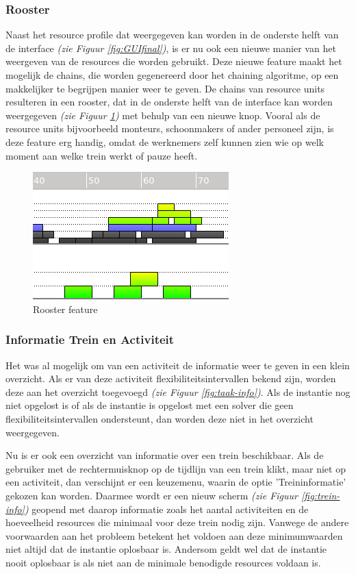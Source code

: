 \subsubsection{Rooster}
Naast het resource profile dat weergegeven kan worden in de onderste helft van de interface \emph{(zie Figuur \ref{fig:GUIfinal})}, is er nu ook een nieuwe manier van het weergeven van de resources die worden gebruikt. Deze nieuwe feature maakt het mogelijk de chains, die worden gegenereerd door het chaining algoritme, op een makkelijker te begrijpen manier weer te geven. De chains van resource units resulteren in een rooster, dat in de onderste helft van de interface kan worden weergegeven \emph{(zie Figuur \ref{fig:rooster})} met behulp van een nieuwe knop. Vooral als de resource units bijvoorbeeld monteurs, schoonmakers of ander personeel zijn, is deze feature erg handig, omdat de werknemers zelf kunnen zien wie op welk moment aan welke trein werkt of pauze heeft. 

\begin{figure}[H]
\center
\includegraphics[width=.5\textwidth]{../images/rooster.png}
\caption{Rooster feature}
\label{fig:rooster}
\end{figure}

\subsubsection{Informatie Trein en Activiteit}
Het was al mogelijk om van een activiteit de informatie weer te geven in een klein overzicht. Als er van deze activiteit flexibiliteitsintervallen bekend zijn, worden deze aan het overzicht toegevoegd \emph{(zie Figuur \ref{fig:taak-info})}. Als de instantie nog niet opgelost is of als de instantie is opgelost met een solver die geen flexibiliteitsintervallen ondersteunt, dan worden deze niet in het overzicht weergegeven.  

Nu is er ook een overzicht van informatie over een trein beschikbaar. Als de gebruiker met de rechtermuisknop op de tijdlijn van een trein klikt, maar niet op een activiteit, dan verschijnt er een keuzemenu, waarin de optie 'Treininformatie' gekozen kan worden. Daarmee wordt er een nieuw scherm \emph{(zie Figuur \ref{fig:trein-info})} geopend met daarop informatie zoals het aantal activiteiten en de hoeveelheid resources die minimaal voor deze trein nodig zijn. Vanwege de andere voorwaarden aan het probleem betekent het voldoen aan deze minimumwaarden niet altijd dat de instantie oplosbaar is. Andersom geldt wel dat de instantie nooit oplosbaar is als niet aan de minimale benodigde resources voldaan is.

